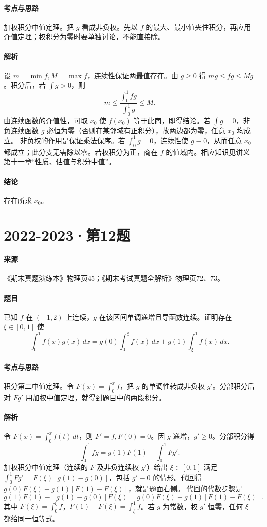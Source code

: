 \documentclass[UTF8,fontset=fandol,12pt,oneside,openany]{ctexrep}
\theoremstyle{definition}
\begin{document}
\paragraph{考点与思路}
加权积分中值定理。把 $g$ 看成非负权。先以 $f$ 的最大、最小值夹住积分，再应用介值定理；权积分为零时要单独讨论，不能直接除。
\paragraph{解析}
设 $m=\min f,M=\max f$，连续性保证两最值存在。由 $g\ge0$ 得 $mg\le fg\le Mg$。积分后，若 $\int g>0$，则
\[m\le\frac{\int_0^1fg}{\int_0^1g}\le M.\]
由连续函数的介值性，可取 $x_0$ 使 $f(x_0)$ 等于此商，即得结论。若 $\int g=0$，非负连续函数 $g$ 必恒为零（否则在某邻域有正积分），故两边都为零，任意 $x_0$ 均成立。
非负权的作用是保证乘法保序。若 $\int_0^1g=0$，连续性使 $g\equiv0$，从而任意 $x_0$ 都成立；此分支无需除以零。若权积分为正，商在 $f$ 的值域内。相应知识见讲义第十一章“性质、估值与积分中值”。
\paragraph{结论}
存在所求 $x_0$。

\par\addvspace{18pt}\noindent\begin{minipage}{\linewidth}
\section{2022-2023·第12题}
\label{exam:11:q10}
\paragraph{来源} 《期末真题演练本》物理页45；《期末考试真题全解析》物理页72、73。
\paragraph{题目}
已知 $f$ 在 $(-1,2)$ 上连续，$g$ 在该区间单调递增且导函数连续。证明存在 $\xi\in[0,1]$ 使
\[\int_0^1f(x)g(x)\,dx=g(0)\int_0^\xi f(x)\,dx+g(1)\int_\xi^1f(x)\,dx.\]
\end{minipage}\par
\paragraph{考点与思路}
积分第二中值定理。令 $F(x)=\int_0^xf$，把 $g$ 的单调性转成非负权 $g'$。分部积分后对 $Fg'$ 用加权中值定理，就得到题目中的两段积分。
\paragraph{解析}
令 $F(x)=\int_0^xf(t)\,dt$，则 $F'=f,F(0)=0$。因 $g$ 递增，$g'\ge0$。分部积分得
\[\int_0^1fg=g(1)F(1)-\int_0^1Fg'.\]
加权积分中值定理（连续的 $F$ 及非负连续权 $g'$）给出 $\xi\in[0,1]$ 满足 $\int_0^1Fg'=F(\xi)[g(1)-g(0)]$，包括 $g'\equiv0$ 的情形。代回得 $g(0)F(\xi)+g(1)[F(1)-F(\xi)]$，就是题面右侧。
代回的代数步骤是
\[
g(1)F(1)-[g(1)-g(0)]F(\xi)
=g(0)F(\xi)+g(1)[F(1)-F(\xi)].
\]
其中 $F(\xi)=\int_0^\xi f$，$F(1)-F(\xi)=\int_\xi^1f$。若 $g$ 为常数，权 $g'$ 恒零，任何 $\xi$ 都给同一恒等式。
\end{document}
